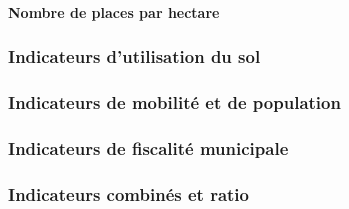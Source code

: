     \paragraph{Nombre de places par hectare}

    \subsubsection{Indicateurs d'utilisation du sol}
    
    \subsubsection{Indicateurs de mobilité et de population}
    
    \subsubsection{Indicateurs de fiscalité municipale}
    
    \subsubsection{Indicateurs combinés et ratio}